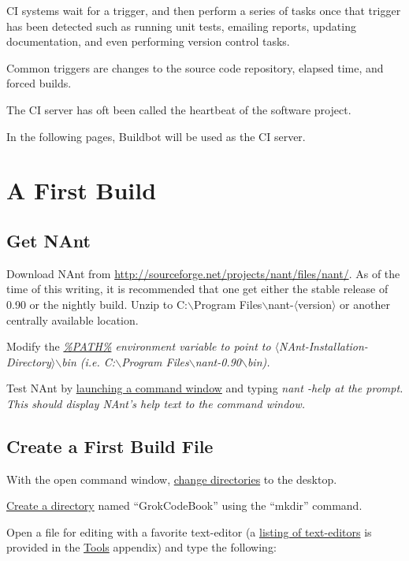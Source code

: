\gls{CI} systems wait for a trigger, and then perform a series of tasks once that trigger has been detected such as running unit tests,
emailing reports, updating documentation, and even performing version control tasks.

Common triggers are changes to the source code repository, elapsed time, and forced builds.

The \gls{CI} server has oft been called the heartbeat of the software project.

In the following pages, \gls{Buildbot} will be used as the CI server.

\section{A First Build}

\subsection{Get NAnt}
Download \gls{NAnt} from \url{http://sourceforge.net/projects/nant/files/nant/}. As of the time of this writing, it is recommended that one get
either the stable release of 0.90 or the nightly build. Unzip to C:$\backslash$Program Files$\backslash$nant-$\langle$version$\rangle$ or another centrally available 
location.

Modify the \em \hyperref[path]{\%PATH\%} \em environment variable to point to $\langle$NAnt-Installation-Directory$\rangle$$\backslash$bin (i.e. C:$\backslash$Program Files$\backslash$nant-0.90$\backslash$bin).

Test NAnt by \hyperref[launch-command-window]{launching a command window} and typing \em nant -help \em at the prompt. This should display NAnt's help text to the command window.

\subsection{Create a First Build File}
With the open command window, \hyperref[change-directories]{change directories} to the desktop.

\hyperref[create-directory]{Create a directory} named ``GrokCodeBook'' using the ``mkdir'' command.

Open a file for editing with a favorite \gls{text-editor} (a \hyperref[text-editors]{listing of text-editors} is provided in the \hyperref[tools]{Tools} appendix) and type the following:




